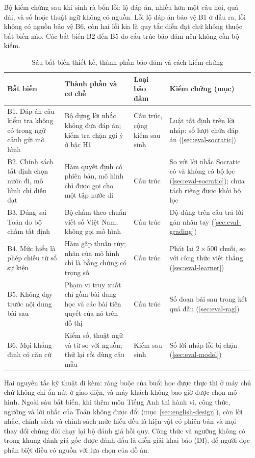 Bộ kiểm chứng sau khi sinh rà bốn lỗi: lộ đáp án, nhiều hơn một câu hỏi, quá dài, và số hoặc thuật ngữ không có nguồn. Lỗi lộ đáp án bảo vệ B1 ở đầu ra, lỗi không có nguồn bảo vệ B6, còn hai lỗi kia là quy tắc diễn đạt chứ không thuộc bất biến nào. Các bất biến B2 đến B5 do cấu trúc bảo đảm nên không cần bộ kiểm.

\begin{table}[H]
\centering
\caption{Sáu bất biến thiết kế, thành phần bảo đảm và cách kiểm chứng}\label{tab:invariants}
\small
\begin{tabular}{>{\raggedright\arraybackslash}p{3.6cm}>{\raggedright\arraybackslash}p{3.7cm}>{\raggedright\arraybackslash}p{2.1cm}>{\raggedright\arraybackslash}p{3.7cm}}
\toprule
Bất biến & Thành phần và cơ chế & Loại bảo đảm & Kiểm chứng (mục) \\
\midrule
B1. Đáp án câu kiểm tra không có trong ngữ cảnh gửi mô hình & Bộ dựng lời nhắc không đưa đáp án; kiểm tra chặn gợi ý ở bậc H1 & Cấu trúc, cộng kiểm sau sinh & Luật tất định trên lời nháp: số lượt chứa đáp án (\ref{sec:eval-socratic}) \\
B2. Chính sách tất định chọn nước đi, mô hình chỉ diễn đạt & Hàm quyết định có phiên bản, mô hình chỉ được gọi cho một tập nước đi & Cấu trúc & So với lời nhắc Socratic có và không có bộ lọc (\ref{sec:eval-socratic}); chưa tách riêng được khỏi bộ lọc \\
B3. Đúng sai Toán do bộ chấm tất định & Bộ chấm theo chuẩn viết số Việt Nam, không gọi mô hình & Cấu trúc & Độ đúng trên câu trả lời gán nhãn tay (\ref{sec:eval-grading}) \\
B4. Mức hiểu là phép chiếu từ sổ sự kiện & Hàm gấp thuần túy; nhãn của mô hình chỉ là bằng chứng có trọng số & Cấu trúc & Phát lại $2\times500$ chuỗi, so với công thức viết thẳng (\ref{sec:eval-learner}) \\
B5. Không dạy trước nội dung bài sau & Phạm vi truy xuất chỉ gồm bài đang học và các bài tiên quyết của nó trên đồ thị & Cấu trúc & Số đoạn bài sau trong kết quả đầu (\ref{sec:eval-rag}) \\
B6. Mọi khẳng định có căn cứ & Kiểm số, thuật ngữ và từ so với nguồn; thử lại rồi dùng câu mẫu & Kiểm sau sinh & Số lời nháp lỗi bị chặn (\ref{sec:eval-model}) \\
\bottomrule
\end{tabular}
\end{table}

Hai nguyên tắc kỹ thuật đi kèm: ràng buộc của buổi học được thực thi ở máy chủ chứ không chỉ ẩn nút ở giao diện, và máy khách không bao giờ được chọn mô hình. Ngoài sáu bất biến, khi thêm môn Tiếng Anh thì hành vi, công thức, ngưỡng và lời nhắc của Toán không được đổi (mục~\ref{sec:english-design}), còn lời nhắc, chính sách và chính sách mức hiểu đều là hiện vật có phiên bản và mọi thay đổi chúng đòi chạy lại bộ đánh giá hồi quy. Công thức và ngưỡng không có trong khung đánh giá gốc được đánh dấu là diễn giải khai báo (DI), để người đọc phân biệt điều có nguồn với lựa chọn của đồ án.
